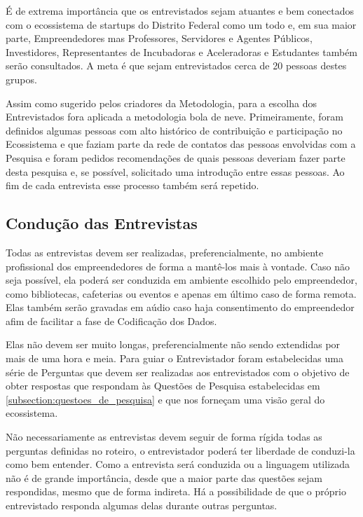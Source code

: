 É de extrema importância que os entrevistados sejam atuantes e bem conectados com o ecossistema de startups do Distrito Federal como um todo e, em sua maior parte, Empreendedores mas Professores, Servidores e Agentes Públicos, Investidores, Representantes de Incubadoras e Aceleradoras e Estudantes também serão consultados. A meta é que sejam entrevistados cerca de 20 pessoas destes grupos.

Assim como sugerido pelos criadores da Metodologia, para a escolha dos Entrevistados fora aplicada a metodologia bola de neve. Primeiramente, foram definidos algumas pessoas com alto histórico de contribuição e participação no Ecossistema e que faziam parte da rede de contatos das pessoas envolvidas com a Pesquisa e foram pedidos recomendações de quais pessoas deveriam fazer parte desta pesquisa e, se possível, solicitado uma introdução entre essas pessoas. Ao fim de cada entrevista esse processo também será repetido. 

\subsection{Condução das Entrevistas}
\label{subsection:conducao_das_entrevistas}

Todas as entrevistas devem ser realizadas, preferencialmente, no ambiente profissional dos empreendedores de forma a mantê-los mais à vontade. Caso não seja possível, ela poderá ser conduzida em ambiente escolhido pelo empreendedor, como bibliotecas, cafeterias ou eventos e apenas em último caso de forma remota. Elas também serão gravadas em aúdio caso haja consentimento do empreendedor afim de facilitar a fase de Codificação dos Dados.

Elas não devem ser muito longas, preferencialmente não sendo extendidas por mais de uma hora e meia. Para guiar o Entrevistador foram estabelecidas uma série de Perguntas que devem ser realizadas aos entrevistados com o objetivo de obter respostas que respondam às Questões de Pesquisa estabelecidas em \ref{subsection:questoes_de_pesquisa} e que nos forneçam uma visão geral do ecossistema. 

Não necessariamente as entrevistas devem seguir de forma rígida todas as perguntas definidas no roteiro, o entrevistador poderá ter liberdade de conduzi-la como bem entender. Como a entrevista será conduzida ou a linguagem utilizada não é de grande importância, desde que a maior parte das questões sejam respondidas, mesmo que de forma indireta. Há a possibilidade de que o próprio entrevistado responda algumas delas durante outras perguntas. 

